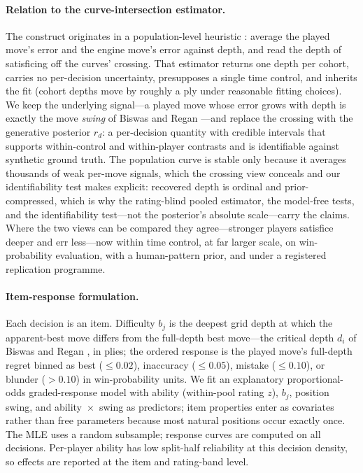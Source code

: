 \paragraph{Relation to the curve-intersection estimator.}
The construct originates in a population-level heuristic \citep{biswas2015}: average the
played move's error and the engine move's error against depth, and read the depth of
satisficing off the curves' crossing. That estimator returns one depth per cohort, carries no
per-decision uncertainty, presupposes a single time control, and inherits the fit (cohort
depths move by roughly a ply under reasonable fitting choices). We keep the underlying
signal---a played move whose error grows with depth is exactly the move \emph{swing} of
Biswas and Regan \citep{biswas2015}---and replace the crossing with the generative posterior
$r_d$: a per-decision quantity with credible intervals that supports within-control and
within-player contrasts and is identifiable against synthetic ground truth. The population
curve is stable only because it averages thousands of weak per-move signals, which the
crossing view conceals and our identifiability test makes explicit: recovered depth is
ordinal and prior-compressed, which is why the rating-blind pooled estimator, the model-free
tests, and the identifiability test---not the posterior's absolute scale---carry the claims. Where the two views can be compared they
agree---stronger players satisfice deeper and err less---now within time control, at far
larger scale, on win-probability evaluation, with a human-pattern prior, and under a
registered replication programme.

\paragraph{Item-response formulation.}
Each decision is an item. Difficulty $b_j$ is the deepest grid depth at which the
apparent-best move differs from the full-depth best move---the critical depth $d_i$ of
Biswas and Regan \citep{biswas2015}, in plies; the
ordered response is the played move's full-depth regret binned as best ($\le0.02$),
inaccuracy ($\le0.05$), mistake ($\le0.10$), or blunder ($>0.10$) in win-probability units.
We fit an explanatory proportional-odds graded-response model
\citep{samejima1969,fischer1973} with ability (within-pool rating $z$), $b_j$, position
swing, and ability~$\times$~swing as predictors; item properties enter as covariates rather
than free parameters because most natural positions occur exactly once. The MLE uses a random
subsample; response curves are computed on all decisions. Per-player ability has low
split-half reliability at this decision density, so effects are reported at the item and
rating-band level.

